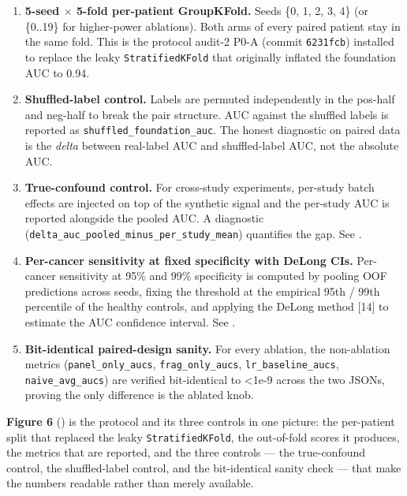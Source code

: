 \documentclass[11pt]{article}
\begin{document}
\begin{enumerate}
\item
\textbf{5-seed $\times$ 5-fold per-patient GroupKFold.} Seeds \{0, 1, 2, 3, 4\} (or \{0..19\} for higher-power ablations). Both arms of every paired patient stay in the same fold. This is the protocol audit-2 P0-A (commit \texttt{6231fcb}) installed to replace the leaky \texttt{StratifiedKFold} that originally inflated the foundation AUC to 0.94.
\item
\textbf{Shuffled-label control.} Labels are permuted independently in the pos-half and neg-half to break the pair structure. AUC against the shuffled labels is reported as \texttt{shuffled\_\allowbreak{}foundation\_\allowbreak{}auc}. The honest diagnostic on paired data is the \textit{delta} between real-label AUC and shuffled-label AUC, not the absolute AUC.
\item
\textbf{True-confound control.} For cross-study experiments, per-study batch effects are injected on top of the synthetic signal and the per-study AUC is reported alongside the pooled AUC. A diagnostic (\texttt{delta\_\allowbreak{}auc\_\allowbreak{}pooled\_\allowbreak{}minus\_\allowbreak{}per\_\allowbreak{}study\_\allowbreak{}mean}) quantifies the gap. See .
\item
\textbf{Per-cancer sensitivity at fixed specificity with DeLong CIs.} Per-cancer sensitivity at 95\% and 99\% specificity is computed by pooling OOF predictions across seeds, fixing the threshold at the empirical 95th / 99th percentile of the healthy controls, and applying the DeLong method [14] to estimate the AUC confidence interval. See .
\item
\textbf{Bit-identical paired-design sanity.} For every ablation, the non-ablation metrics (\texttt{panel\_\allowbreak{}only\_\allowbreak{}aucs}, \texttt{frag\_\allowbreak{}only\_\allowbreak{}aucs}, \texttt{lr\_\allowbreak{}baseline\_\allowbreak{}aucs}, \texttt{naive\_\allowbreak{}avg\_\allowbreak{}aucs}) are verified bit-identical to \textless{}1e-9 across the two JSONs, proving the only difference is the ablated knob.
\end{enumerate}

\textbf{Figure 6} () is the protocol and its three controls in one picture: the per-patient split that replaced the leaky \texttt{StratifiedKFold}, the out-of-fold scores it produces, the metrics that are reported, and the three controls --- the true-confound control, the shuffled-label control, and the bit-identical sanity check --- that make the numbers readable rather than merely available.
\end{document}
